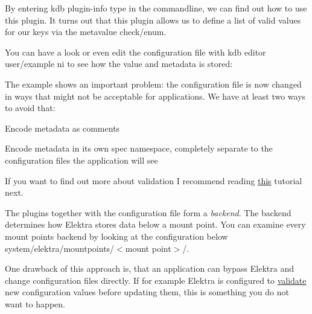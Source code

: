 By entering {\ttfamily kdb plugin-\/info type} in the commandline, we can find out how to use this plugin. It turns out that this plugin allows us to define a list of valid values for our keys via the metavalue {\ttfamily check/enum}.




You can have a look or even edit the configuration file with {\ttfamily kdb editor user/example ni} to see how the value and metadata is stored\+:




The example shows an important problem\+: the configuration file is now changed in ways that might not be acceptable for applications. We have at least two ways to avoid that\+:


\begin{DoxyEnumerate}
\item Encode metadata as comments
\item Encode metadata in its own {\ttfamily spec} namespace, completely separate to the configuration files the application will see
\end{DoxyEnumerate}

If you want to find out more about validation I recommend reading \hyperlink{doc_tutorials_validation_md}{this} tutorial next.

The plugins together with the configuration file form a {\itshape backend}. The backend determines how Elektra stores data below a mount point. You can examine every mount points backend by looking at the configuration below {\ttfamily system/elektra/mountpoints/$<$mount point$>$/}.

One drawback of this approach is, that an application can bypass Elektra and change configuration files directly. If for example Elektra is configured to \hyperlink{doc_tutorials_validation_md}{validate} new configuration values before updating them, this is something you do not want to happen.

